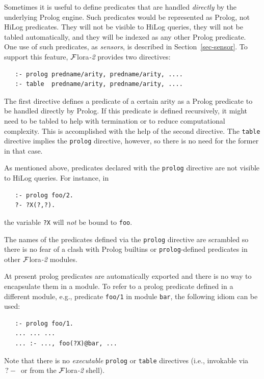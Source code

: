 \documentclass[11pt]{article}
\newcommand{\query}{\mbox{$\, ?\! - \, $}}                  %
\newcommand{\FLORA}{{\mbox{\sc ${\cal F}${lora}\rm\emph{-2}}}\xspace}
\begin{document}
Sometimes it is useful to define predicates that are handled
\emph{directly} by the underlying Prolog engine. Such predicates would be
represented as Prolog, not HiLog predicates. They will not be visible to
HiLog queries, they will not be tabled automatically,
and they will be indexed as any other Prolog predicate.
One use of such predicates, as \emph{sensors}, is described in
Section~\ref{sec-sensor}.
To support this feature, \FLORA provides two directives:
\begin{verbatim}
   :- prolog predname/arity, predname/arity, ....
   :- table  predname/arity, predname/arity, ....
\end{verbatim}
The first directive defines a predicate of a certain arity as a Prolog
predicate to be handled directly by Prolog. If this predicate is defined
recursively, it might need to be tabled to help with termination or to
reduce computational complexity. This is accomplished with the help of the
second directive. The \texttt{table} directive implies the \texttt{prolog}
directive, however, so there is no need for the former in that case.

As mentioned above, predicates declared with the \texttt{prolog} directive
are not visible to HiLog queries. For instance, in
\begin{verbatim}
   :- prolog foo/2.
   ?- ?X(?,?).
\end{verbatim}
the variable \texttt{?X} will \emph{not} be bound to \texttt{foo}.  

The names of the predicates defined via the \texttt{prolog} directive 
are scrambled so there is no fear of a clash with Prolog builtins or
\texttt{prolog}-defined  predicates in other \FLORA modules.

At present prolog predicates are automatically exported and there is no way
to encapsulate them in a module. To refer to a prolog predicate defined in
a different module, e.g., predicate \texttt{foo/1} in module \texttt{bar},
the following idiom can be used:
\begin{verbatim}
   :- prolog foo/1.
   ... ... ...
   ... :- ..., foo(?X)@bar, ...
\end{verbatim}
Note that there is no \emph{executable}  \texttt{prolog} or \texttt{table}
directives (i.e., invokable via $\query$ or from the \FLORA shell).
\end{document}
